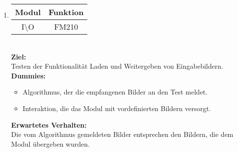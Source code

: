 	\begin{enumerate}[align=left, leftmargin=4em, label={\textbf{\textbackslash T2.\arabic*0\textbackslash}} ]
		\item \begin{tabular}{|c|c|}
			\hline Modul & Funktion \\ 
			\hline I\textbackslash O & FM210 \\ 
			\hline 
		\end{tabular}\\ 
		\subitem \textbf{Ziel:}\\ Testen der Funktionalität Laden und Weitergeben von Eingabebildern.
		\subitem \textbf{Dummies:} \begin{itemize}
			\item Algorithmus, der die empfangenen Bilder an den Test meldet.
			\item Interaktion, die das Modul mit vordefinierten Bildern versorgt.
		\end{itemize}
		\subitem \textbf{Erwartetes Verhalten:}\\
		Die vom Algorithmus gemeldeten Bilder entsprechen den Bildern, die dem Modul übergeben wurden.
		

\end{enumerate}
